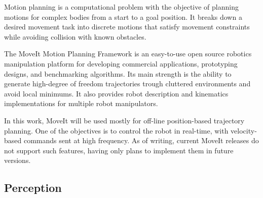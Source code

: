 
\par Motion planning is a computational problem with the objective of planning motions for complex bodies from a start to a goal position. It breaks down a desired movement task into discrete motions that satisfy movement constraints while avoiding collision with known obstacles. 
\par The MoveIt Motion Planning Framework is an easy-to-use open source robotics manipulation platform for developing commercial applications, prototyping designs, and benchmarking algorithms. Its main strength is the ability to generate high-degree of freedom trajectories trough cluttered environments and avoid local minimums. It also provides robot description and kinematics implementations for multiple robot manipulators. 
\par In this work, MoveIt will be used mostly for off-line position-based trajectory planning. One of the objectives is to control the robot in real-time, with velocity-based commands sent at high frequency. As of writing, current MoveIt releases do not support such features, having only plans to implement them in future versions.



\subsection{Perception}

\par 





